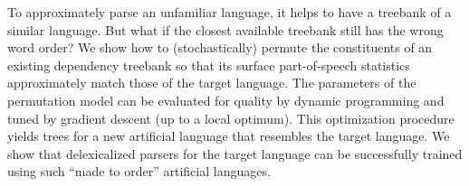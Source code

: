 To approximately parse an unfamiliar language, it helps to have a treebank of a similar language.  But what if the closest available treebank still has the wrong word order?  We show how to (stochastically) permute the constituents of an existing dependency treebank so that its surface part-of-speech statistics approximately match those of the target language.  The parameters of the permutation model can be evaluated for quality by dynamic programming and tuned by gradient descent (up to a local optimum).  This optimization procedure yields trees for a new artificial language that resembles the target language.  We show that delexicalized parsers for the target language can be successfully trained using such ``made to order'' artificial languages.
